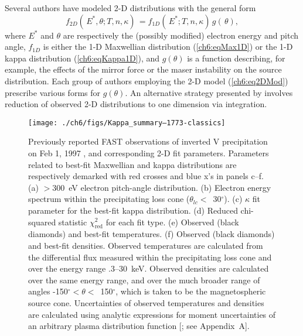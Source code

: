   Several authors \citep{Maggs1981,Bingham1999,Bingham2000,Mutel2007} have
  modeled 2-D distributions with the general form
    \begin{equation} \label{ch6:eq2DMod} f_{2D}(\, E^*, \theta ; T, n,
      \kappa) \, = f_{1D}(\, E^*; T, n, \kappa) \, g(\, \theta),
    \end{equation}
    where $E^*$ and $\theta$ are respectively the (possibly modified)
    electron energy and pitch angle, $f_{1D}$ is either the 1-D
    Maxwellian distribution (\ref{ch6:eqMax1D}) or the 1-D kappa
    distribution (\ref{ch6:eqKappa1D}), and $g(\theta )$ is a
    function describing, for example, the effects of the mirror force
    or the maser instability on the source distribution. Each group of
    authors employing the 2-D model (\ref{ch6:eq2DMod}) prescribe
    various forms for $g(\theta)$. An alternative strategy presented
    by \citet{Pritchett1999} involves reduction of observed 2-D
    distributions to one dimension via integration.


  \begin{figure}
    \centering
    \noindent\texttt{[image: ./ch6/figs/Kappa\_summary--1773-classics]}
    \caption[Inverted V precipitation and best-fit
    Maxwellian and kappa distribution parameters (Orbit 1773)]{Previously reported
      FAST observations of inverted V precipitation on Feb 1, 1997
      \citep{Elphic1998}, and corresponding 2-D fit
      parameters. Parameters related to best-fit Maxwellian and kappa
      distributions are respectively demarked with red crosses and
      blue x's in panels c--f. (a) $>$300~eV electron pitch-angle
      distribution. (b) Electron energy spectrum within the
      precipitating loss cone ($\theta_{lc} <$~30$^\circ$). (c) $\kappa$
      fit parameter for the best-fit kappa distribution. (d) Reduced
      chi-squared statistic $\chi^2_{\mathrm{red}}$ for each fit
      type. (e) Observed (black diamonds) and best-fit
      temperatures. (f) Observed (black diamonds) and best-fit
      densities. Observed temperatures are calculated from the
      differential flux measured within the precipitating loss cone and
      over the energy range .3--30~keV. Observed densities are
      calculated over the same energy range, and over the much broader
      range of angles -150$^\circ < \theta <$~150$^\circ$, which is
      taken to be the magnetospheric source cone. Uncertainties of
      observed temperatures and densities are calculated using
      analytic expressions for moment uncertainties of an arbitrary
      plasma distribution function [\citealt{Gershman2015}; see
      Appendix~A].}
    \label{ch6:Fig1}
  \end{figure}


